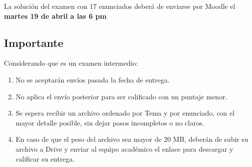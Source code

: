 La solución del examen con $17$ enunciados deberá de enviarse por Moodle el \textbf{martes 19 de abril a las 6 pm}

\subsection{Importante}

Considerando que es un examen intermedio:
\begin{enumerate}
\item No se aceptarán envíos pasada la fecha de entrega.
\item No aplica el envío posterior para ser calificado con un puntaje menor.
\item Se espera recibir un archivo ordenado por Tema y por enunciado, con el mayor detalle posible, sin dejar pasos incompletos o no claros.
\item En caso de que el peso del archivo sea mayor de $20$ MB, deberán de subir su archivo a Drive y enviar al equipo académico el enlace para descargar y calificar su entrega.
\end{enumerate}

